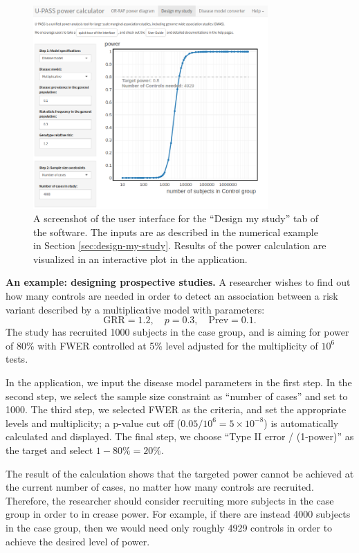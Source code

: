 \begin{figure}
    \centering
    \includegraphics[width=0.8\textwidth]{figures/UPASS_power_analysis.png}
    \caption{A screenshot of the user interface for the ``Design my study'' tab of the software. The inputs are as described in the numerical example in Section \ref{sec:design-my-study}. Results of the power calculation are visualized in an interactive plot in the application.}
    \label{fig:UPASS-power-analysis}
\end{figure}


\bigskip
\noindent
{\bf An example: designing prospective studies.}
A researcher wishes to find out how many controls are needed in order to detect an association between a risk variant described by a multiplicative model with parameters:
$$
\text{GRR} = 1.2, \quad p = 0.3, \quad \text{Prev} = 0.1.
$$
The study has recruited 1000 subjects in the case group, and is aiming for power of 80\% with FWER controlled at 5\% level adjusted for the multiplicity of $10^6$ tests.

In the application, we input the disease model parameters in the first step.
In the second step, we select the sample size constraint as ``number of cases'' and set to 1000.
The third step, we selected FWER as the criteria, and set the appropriate levels and multiplicity; a p-value cut off ($0.05/10^6=5\times10^{-8}$) is automatically calculated and displayed.
The final step, we choose ``Type II error / (1-power)'' as the target and select $1-80\%=20\%$.

The result of the calculation shows that the targeted power cannot be achieved at the current number of cases, no matter how many controls are recruited.
Therefore, the researcher should consider recruiting more subjects in the case group in order to in crease power.
For example, if there are instead 4000 subjects in the case group, then we would need only roughly 4929 controls in order to achieve the desired level of power.


